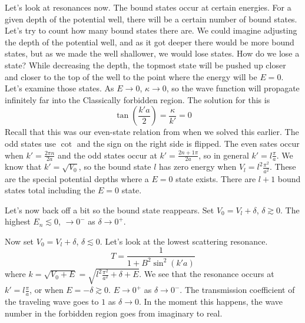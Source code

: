 \documentclass[a4paper,twoside,master.tex]{subfiles}
\begin{document}
Let's look at resonances now. The bound states occur at certain energies. For a given depth of the potential well, there will be a certain number of bound states. Let's try to count how many bound states there are. We could imagine adjusting the depth of the potential well, and as it got deeper there would be more bound states, but as we made the well shallower, we would lose states. How do we lose a state? While decreasing the depth, the topmost state will be pushed up closer and closer to the top of the well to the point where the energy will be $ E = 0 $. Let's examine those states. As $ E \to 0 $, $ \kappa \to 0 $, so the wave function will propagate infinitely far into the Classically forbidden region. The solution for this is
\begin{equation}
    \tan\left( \frac{k' a}{2} \right) = \frac{\kappa}{k'} = 0
\end{equation}
Recall that this was our even-state relation from when we solved this earlier. The odd states use $ \cot $ and the sign on the right side is flipped. The even sates occur when $ k' = \frac{2 \pi n}{2a} $ and the odd states occur at $ k' = \frac{2n + 1 \pi}{2a} $, so in general $ k' = l \frac{\pi}{a} $. We know that $ k' = \sqrt{V_0} $, so the bound state $ l $ has zero energy when $ V_l = l^2 \frac{\pi^2}{a^2} $. These are the special potential depths where a $ E = 0 $ state exists. There are $ l + 1 $ bound states total including the $ E = 0 $ state.

Let's now back off a bit so the bound state reappears. Set $ V_0 = V_l + \delta $, $ \delta \gtrsim 0 $. The highest $ E_n \lesssim 0 $, $ \to 0^- $ as $ \delta \to 0^+ $.

Now set $ V_0 = V_l + \delta $, $ \delta \lesssim 0 $. Let's look at the lowest scattering resonance.
\begin{equation}
    T = \frac{1}{1 + B^2 \sin^2(k'a)}
\end{equation}
where $ k = \sqrt{V_0 + E} = \sqrt{l^2 \frac{\pi^2}{a^2} + \delta + E} $. We see that the resonance occurs at $ k' = l \frac{\pi}{a} $, or when $ E = - \delta \gtrsim 0 $. $ E \to 0^+ $ as $ \delta \to 0^- $. The transmission coefficient of the traveling wave goes to $ 1 $ as $ \delta \to 0 $. In the moment this happens, the wave number in the forbidden region goes from imaginary to real.
\end{document}
